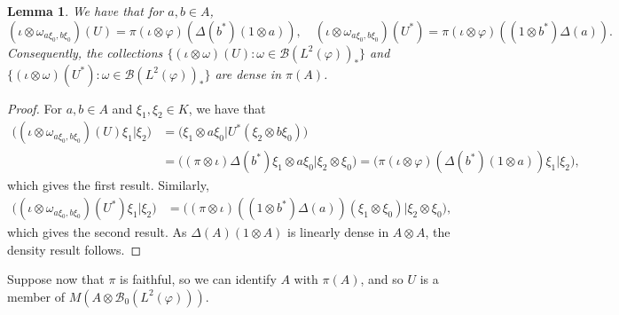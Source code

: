 \documentclass[twoside,a4paper,12pt]{article}
\theoremstyle{plain}
\newtheorem{lemma}[proposition]{Lemma}
\theoremstyle{definition}
\newcommand{\mc}{\mathcal}
\begin{document}
\begin{lemma}\label{lem:dense}
We have that for $a,b\in A$,
\[ (\iota\otimes\omega_{a\xi_0,b\xi_0})(U)
= \pi (\iota\otimes\varphi)(\Delta(b^*)(1\otimes a)), \quad
(\iota\otimes\omega_{a\xi_0,b\xi_0})(U^*) = 
\pi  (\iota\otimes\varphi)((1\otimes b^*)\Delta(a)). \]
Consequently, the collections
$\{ (\iota\otimes\omega)(U) : \omega\in \mc B(L^2(\varphi))_* \}$
and $\{ (\iota\otimes\omega)(U^*) : \omega\in \mc B(L^2(\varphi))_* \}$
are dense in $\pi(A)$.
\end{lemma}
\begin{proof}
For $a,b \in A$ and $\xi_1,\xi_2\in K$, we have that
\begin{align*} \big( (\iota\otimes\omega_{a\xi_0,b\xi_0})(U)
   \xi_1 \big| \xi_2 \big) &=
\big( \xi_1\otimes a\xi_0 \big| U^*(\xi_2 \otimes b\xi_0) \big) \\
&= \big((\pi\otimes\iota)\Delta(b^*)\xi_1 \otimes a\xi_0 \big|
   \xi_2\otimes\xi_0 \big)
= \big( \pi(\iota\otimes\varphi)(\Delta(b^*)(1\otimes a)) \xi_1 \big| \xi_2 \big),
\end{align*}
which gives the first result.  Similarly,
\begin{align*} \big( (\iota\otimes\omega_{a\xi_0,b\xi_0})(U^*)
   \xi_1 \big| \xi_2 \big) &=
\big( (\pi\otimes\iota)((1\otimes b^*)\Delta(a))(\xi_1\otimes\xi_0) \big|
   \xi_2\otimes \xi_0 \big),
\end{align*}
which gives the second result.
As $\Delta(A)(1\otimes A)$ is linearly dense in $A\otimes A$, the
density result follows.
\end{proof}

Suppose now that $\pi$ is faithful, so we can identify $A$ with $\pi(A)$,
and so $U$ is a member of $M(A\otimes\mc B_0(L^2(\varphi)))$.
\end{document}
